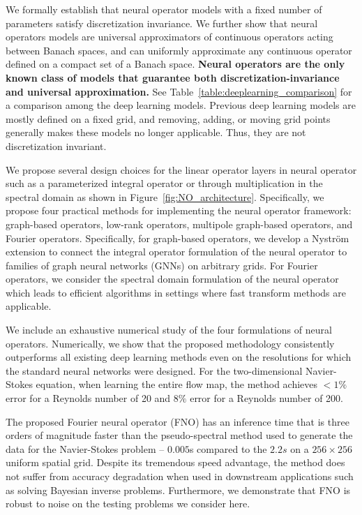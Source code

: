 We  formally establish that neural operator models with a fixed number of parameters satisfy discretization invariance. We further show that neural operators models are universal approximators of continuous operators acting between Banach spaces, and  can uniformly approximate any continuous operator defined on a compact set of a Banach space.   {\bf Neural operators are the only known class of models that guarantee both discretization-invariance and universal approximation.} See Table~\ref{table:deeplearning_comparison} for a comparison among the deep learning models. Previous deep learning models are mostly defined on a fixed grid, and  removing, adding, or moving grid points generally makes these models no longer applicable. Thus, they are  not discretization invariant. 


We propose several design choices for the linear operator layers in neural operator such as a parameterized integral operator or through multiplication in the spectral domain as shown in Figure~\ref{fig:NO_architecture}.  
Specifically, we propose four practical methods for implementing the neural operator framework: graph-based operators, low-rank operators, multipole graph-based operators, and Fourier  operators. Specifically, for graph-based operators, we develop a Nystr\"om extension to connect the integral operator formulation of the neural operator to families of graph neural networks (GNNs) on arbitrary grids. For Fourier operators,  we consider the spectral domain formulation of the neural operator which leads to efficient algorithms in settings where fast transform methods are applicable. 

We include an exhaustive numerical study of the four formulations of neural operators. Numerically, we show that the proposed methodology consistently outperforms all existing deep learning methods even on the resolutions for which the standard neural networks were designed. For the two-dimensional Navier-Stokes equation, when learning the entire flow map,  the method achieves $<1\%$ error for a Reynolds number of 20 and $8\%$ error for a Reynolds number of 200.

The proposed Fourier neural operator (FNO) has an inference time that is three orders of magnitude faster than the pseudo-spectral method used to generate the data for the Navier-Stokes problem \citep{chandler2013invariant} -- $0.005$s compared to the $2.2s$ on a $256 \times 256$ uniform spatial grid. %
Despite its tremendous speed advantage, the method does not suffer from accuracy degradation when used in downstream applications such as solving Bayesian inverse problems. Furthermore, we demonstrate
that FNO is robust to noise on the testing problems we consider here.

